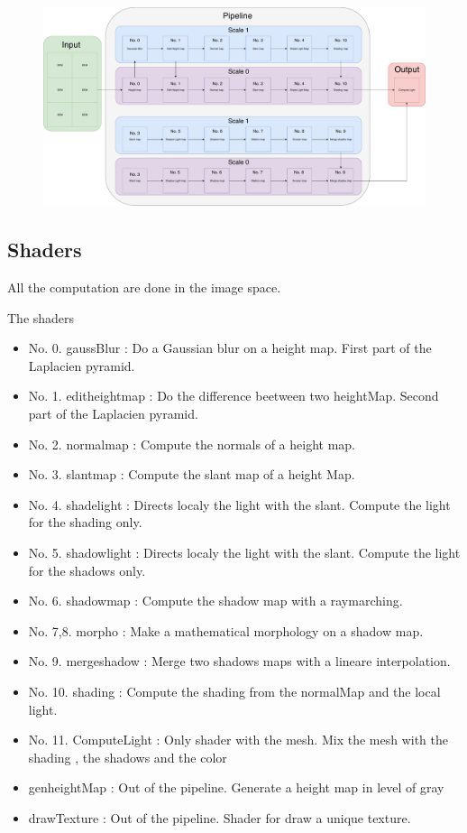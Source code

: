 \documentclass[a4paper]{article}
\begin{document}
\begin{figure}
\begin{centering}
\includegraphics[scale=0.35]{../../ressources/schemas/Pipeline.pdf}
\end{centering}
\end{figure}

\subsection{Shaders}
All the computation are done in the image space. 

The shaders 
\begin{itemize}

\item No. 0. gaussBlur : Do a Gaussian blur on a height map. First part of the Laplacien pyramid.
\item No. 1. editheightmap :  Do the difference beetween two heightMap. Second part of the Laplacien pyramid.
\item No. 2. normalmap : Compute the normals of a height map.
\item No. 3. slantmap : Compute the slant map of a height Map.
\item No. 4. shadelight : Directs localy the light with the slant. Compute the light for the shading only.
\item No. 5. shadowlight : Directs localy the light with the slant. Compute the light for the shadows only.
\item No. 6. shadowmap : Compute the shadow map with a raymarching.
\item No. 7,8. morpho : Make a mathematical morphology on a shadow map.
\item No. 9. mergeshadow :  Merge two shadows maps with a lineare interpolation.
\item No. 10. shading : Compute the shading from the normalMap and the local light.
\item No. 11. ComputeLight : Only shader with the mesh. Mix the mesh with the shading , the shadows and the color
\item genheightMap : Out of the pipeline. Generate a height map in level of gray
\item drawTexture : Out of the pipeline. Shader for draw a unique texture.
\end{itemize}
\end{document}
